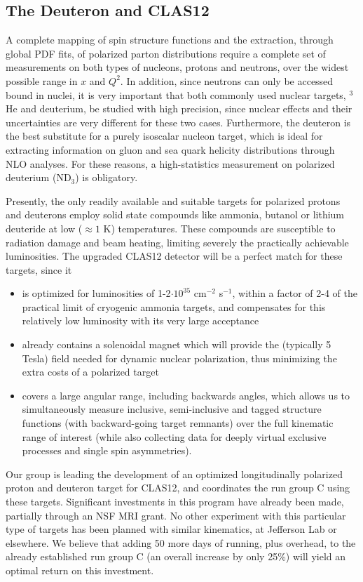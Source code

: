 \subsection{The Deuteron and CLAS12}

A complete mapping of spin structure functions and the extraction, through global PDF fits, of polarized parton distributions require a complete set of measurements on both types of nucleons, protons and neutrons, over the widest possible range in $x$ and $Q^2$. 
In addition, since neutrons can only be accessed bound in nuclei, it is very important that both commonly used nuclear targets, $^3$He and deuterium, be studied with high precision, since nuclear effects and their uncertainties are very different for these two cases. Furthermore, the deuteron is the best substitute for a purely isoscalar nucleon target, which is ideal for extracting information on gluon and sea quark helicity distributions through NLO analyses. For these reasons, a high-statistics measurement on polarized deuterium (ND$_3$) is obligatory.

Presently, the only readily available and suitable targets for polarized protons and deuterons employ solid state compounds like ammonia, butanol or lithium deuteride at low ($\approx 1$ K) temperatures. 
These compounds are susceptible to radiation damage and beam heating, limiting severely the practically achievable luminosities. 
The upgraded CLAS12 detector will be a perfect match for these targets, since it
\begin{itemize}
\item is optimized for luminosities of 1-2$\cdot 10^{35}$ cm$^{-2}$ s$^{-1}$, within a factor of 2-4 of the practical limit of cryogenic ammonia targets, and compensates for this relatively low luminosity with its very large acceptance
\item already contains a solenoidal magnet which will provide the (typically 5 Tesla) field needed for dynamic nuclear polarization, thus minimizing the extra costs of a polarized target
\item covers a large angular range, including backwards angles, which allows us to simultaneously measure inclusive, semi-inclusive and tagged structure functions (with backward-going target remnants) over the full kinematic range of interest (while also collecting data for deeply virtual exclusive processes and single spin asymmetries).
\end{itemize}

Our group is leading the development of an optimized longitudinally polarized proton and deuteron target for CLAS12, and coordinates the run group C using these targets. Significant investments in this program have already been made, partially through an NSF MRI grant. No other experiment with this particular type of targets has been planned with similar kinematics, at Jefferson Lab or elsewhere. We believe that adding 50 more days of running, plus overhead, to the already established run group C (an overall increase by only 25\%) will yield an optimal return on this investment.


